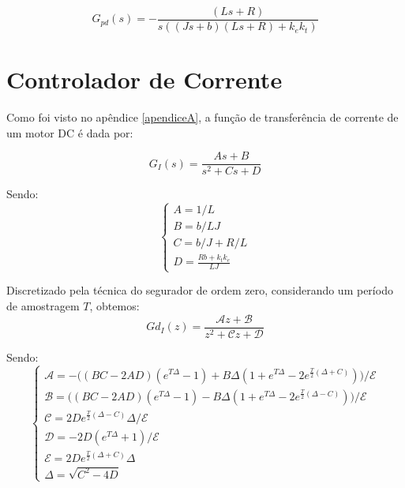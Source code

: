 \documentclass[]{politex}
\begin{document}
\begin{itemize}
    \begin{equation}
    \label{FunctionMotord}
     G_{pd}(s) = - \frac{(L s + R)}{s((J s + b)(L s + R) + k_{e} k_{t})}
    \end{equation}


\end{itemize}

\chapter{Controlador de Corrente} \label{chap:ControladorDeCorrente}

Como foi visto no apêndice \ref{apendiceA}, a função de transferência de corrente de um motor DC é dada por:

\begin{equation} \label{functionTransferMotorCorrente}
G_{I}(s) = \frac{A s+B}{s^2 + C s + D}
\end{equation}

Sendo:
\begin{equation}
\begin{cases}
A = 1/L \\
B = b/LJ \\
C = b/J + R/L \\
D = \frac{Rb + k_t k_e}{LJ}
\end{cases}
\end{equation}

Discretizado pela técnica do segurador de ordem zero, considerando um período de amostragem $T$, obtemos:
\begin{equation}
Gd_{I}(z) = \frac{\mathcal{A} z + \mathcal{B}}{z^2 + \mathcal{C} z + \mathcal{D}}
\end{equation}

Sendo:
\begin{equation}
\begin{cases}
\mathcal{A} = -  \Big( (BC - 2AD)(e^{T \Delta} -1) + B \Delta (1 + e^{T \Delta} - 2 e^{\frac{T}{2}(\Delta+C)} ) \Big) / \mathcal{E}\\
\mathcal{B} =   \Big( (BC - 2AD)(e^{T \Delta} -1) - B \Delta (1 + e^{T \Delta} - 2 e^{\frac{T}{2}(\Delta-C)} ) \Big) / \mathcal{E} \\
\mathcal{C} = 2 D  e^{\frac{T}{2}  (\Delta - C )} \Delta / \mathcal{E} \\
\mathcal{D} = -2 D  \left(e^{T \Delta}+1\right) / \mathcal{E} \\
\mathcal{E} = 2 D  e^{\frac{T}{2}(\Delta + C)} \Delta \\
\Delta = \sqrt{C^2 - 4D}
\end{cases}
\end{equation}
\end{document}
